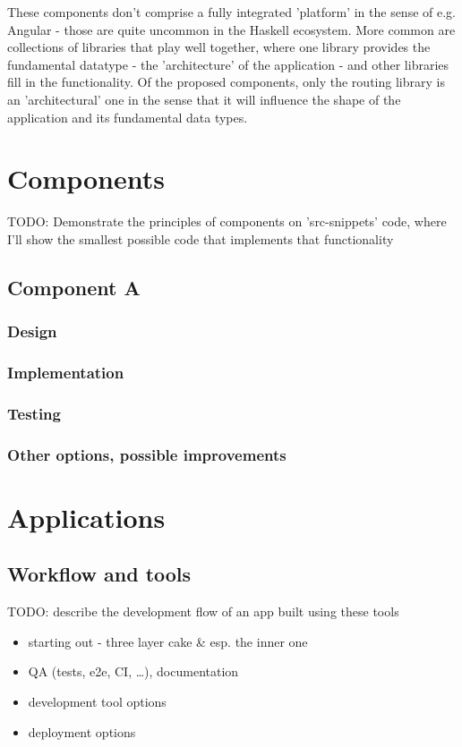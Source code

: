 \documentclass[english,odsaz]{fitthesis}
\begin{document}
These components don't comprise a fully integrated 'platform' in the sense of
e.g. Angular - those are quite uncommon in the Haskell ecosystem. More common
are collections of libraries that play well together, where one library provides
the fundamental datatype - the 'architecture' of the application - and other
libraries fill in the functionality. Of the proposed components, only the
routing library is an 'architectural' one in the sense that it will influence
the shape of the application and its fundamental data types.

\chapter{Components}
\label{sec:org35330fd}
TODO: Demonstrate the principles of components on 'src-snippets' code, where
I'll show the smallest possible code that implements that functionality

\section{Component A}
\label{sec:org0d1a386}
\subsection{Design}
\label{sec:orgf53d003}
\subsection{Implementation}
\label{sec:orgac6752a}
\subsection{Testing}
\label{sec:orgb5e239b}
\subsection{Other options, possible improvements}
\label{sec:org0f0c78d}

\chapter{Applications}
\label{sec:org8326aa8}
\section{Workflow and tools}
\label{sec:org5a50c41}
TODO: describe the development flow of an app built using these tools

\begin{itemize}
\item starting out - three layer cake \& esp. the inner one
\item QA (tests, e2e, CI, \ldots{}), documentation
\item development tool options
\item deployment options
\end{itemize}
\end{document}

